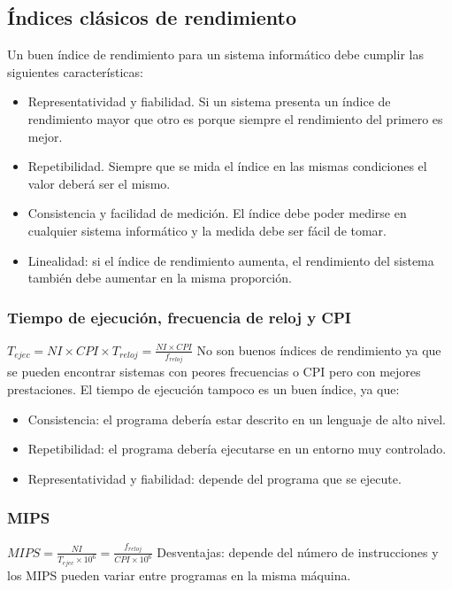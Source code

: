 \documentclass[12pt,spanish]{article}
\begin{document}
\subsection{Índices clásicos de rendimiento}

Un buen índice de rendimiento para un sistema informático debe cumplir las siguientes características:
\begin{itemize}
	\item Representatividad y fiabilidad. Si un sistema presenta un índice de rendimiento mayor que otro es porque siempre el rendimiento del primero es mejor.
	\item Repetibilidad. Siempre que se mida el índice en las mismas condiciones el valor deberá ser el mismo.
	\item Consistencia y facilidad de medición. El índice debe poder medirse en cualquier sistema informático y la medida debe ser fácil de tomar.
	\item Linealidad: si el índice de rendimiento aumenta, el rendimiento del sistema también debe aumentar en la misma proporción.
\end{itemize}

\subsubsection{Tiempo de ejecución, frecuencia de reloj y CPI}
$
T_{ejec}=NI \times CPI \times T_{reloj}=\frac{NI \times CPI}{f_{reloj}}
$
No son buenos índices de rendimiento ya que se pueden encontrar sistemas con peores frecuencias o CPI pero con mejores prestaciones. El tiempo de ejecución tampoco es un buen índice, ya que:
\begin{itemize}
	\item Consistencia: el programa debería estar descrito en un lenguaje de alto nivel.
	\item Repetibilidad: el programa debería ejecutarse en un entorno muy controlado.
	\item Representatividad y fiabilidad: depende del programa que se ejecute.
\end{itemize}

\subsubsection{MIPS}
$
MIPS=\frac{NI}{T_{ejec} \times 10^6}=\frac{f_{reloj}}{CPI \times 10^6}
$
Desventajas: depende del número de instrucciones y los MIPS pueden variar entre programas en la misma máquina.
\end{document}

